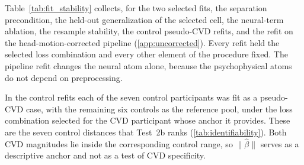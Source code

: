 
Table~\ref{tab:fit_stability} collects, for the two selected fits, the separation precondition, the held-out generalization of the selected cell, the neural-term ablation, the resample stability, the control pseudo-CVD refits, and the refit on the head-motion-corrected pipeline (\cref{app:uncorrected}). Every refit held the selected loss combination and every other element of the procedure fixed. The pipeline refit changes the neural atom alone, because the psychophysical atoms do not depend on preprocessing.

In the control refits each of the seven control participants was fit as a pseudo-CVD case, with the remaining six controls as the reference pool, under the loss combination selected for the CVD participant whose anchor it provides. These are the seven control distances that Test~2b ranks (\cref{tab:identifiability}). Both CVD magnitudes lie inside the corresponding control range, so $\|\hat\beta\|$ serves as a descriptive anchor and not as a test of CVD specificity.

